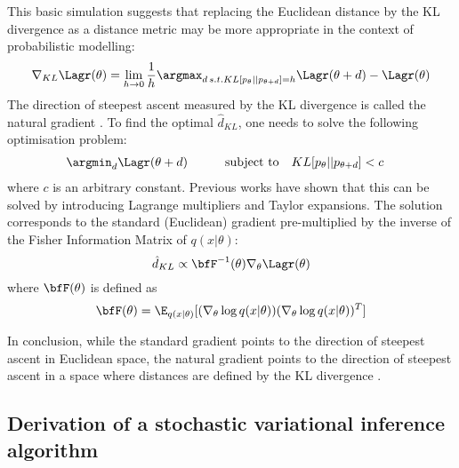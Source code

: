 This basic simulation suggests that replacing the Euclidean distance by the KL divergence as a distance metric may be more appropriate in the context of probabilistic modelling:
\[
	\nabla_{KL} \Lagr(\theta) = \lim_{h\to0} \frac{1}{h}\argmax_{d \, s.t. KL[p_\theta||p_{\theta+d}]=h} \Lagr(\theta+d) - \Lagr(\theta)
\]
The direction of steepest ascent measured by the KL divergence is called the natural gradient \cite{Amari1998,Martens2014}. To find the optimal $\hat{d}_{KL}$, one needs to solve the following optimisation problem:
\begin{equation*} \begin{aligned}
	&\argmin_{d} \Lagr(\theta+d) \qquad
	& \text{subject to}
	& \quad KL[p_\theta||p_{\theta+d}] < c
\end{aligned} \end{equation*}
where $c$ is an arbitrary constant. Previous works have shown that this can be solved by introducing Lagrange multipliers and Taylor expansions\cite{Amari1998,Kristiadi2019}. The solution corresponds to the standard (Euclidean) gradient pre-multiplied by the inverse of the Fisher Information Matrix of $q(x|\theta)$:
\begin{equation}\label{natural_gradient}
	\hat{d}_{KL} \propto \bfF^{-1}(\theta) \nabla_{\theta} \Lagr(\theta)
\end{equation}
where $\bfF(\theta)$ is defined as
\[
	\bfF(\theta) = \E_{q(x|\theta)}[(\nabla_\theta \log q(x|\theta)) (\nabla_\theta \log q(x|\theta))^T]
\]


In conclusion, while the standard gradient points to the direction of steepest ascent in Euclidean space, the natural gradient points to the direction of steepest ascent in a space where distances are defined by the KL divergence \cite{Kristiadi2019,Amari1998,Hoffman2012}.


\subsection{Derivation of a stochastic variational inference algorithm} \label{section:stochastic_variational_inference}


